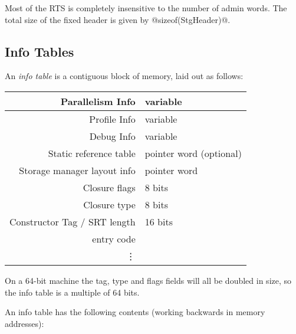 \documentclass[11pt]{article}
\newcommand{\Subsection}[2]{\subsection{#1}\label{sec:#2}}
\begin{document}
Most of the RTS is completely insensitive to the number of admin
words.  The total size of the fixed header is given by
@sizeof(StgHeader)@.

\Subsection{Info Tables}{info-tables}

An \emph{info table} is a contiguous block of memory, laid out as follows:

\begin{center}
\begin{tabular}{|r|l|}
   \hline Parallelism Info 	& variable
\\ \hline Profile Info 		& variable
\\ \hline Debug Info		& variable
\\ \hline Static reference table  & pointer word (optional)
\\ \hline Storage manager layout info & pointer word
\\ \hline Closure flags		& 8 bits
\\ \hline Closure type 		& 8 bits
\\ \hline Constructor Tag / SRT length    	& 16 bits
\\ \hline entry code
\\       \vdots
\end{tabular}
\end{center}

On a 64-bit machine the tag, type and flags fields will all be doubled
in size, so the info table is a multiple of 64 bits.

An info table has the following contents (working backwards in memory
addresses):
\end{document}
